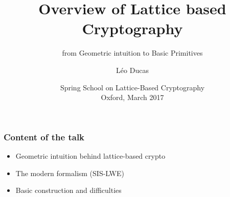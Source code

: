 \documentclass{beamer} %
\title{Overview of Lattice based Cryptography}
\subtitle{from Geometric intuition to Basic Primitives}
\author[Léo Ducas, CWI, Amsterdam, The Netherlands]{\Large Léo Ducas}
\institute{CWI, Amsterdam, The Netherlands \\
\texttt{[image: img/CWI.png]}
}
\date{Spring School on Lattice-Based Cryptography \\
Oxford, March 2017}
\begin{document}
 

\begin{frame}
\titlepage
\end{frame}
\usebackgroundtemplate{}

\begin{frame}
\frametitle{Content of the talk}
\begin{itemize}
  \item Geometric intuition behind lattice-based crypto
  \item The modern formalism (SIS-LWE)
  \item Basic construction and difficulties
\end{itemize}

  
\end{frame}





\end{document}
